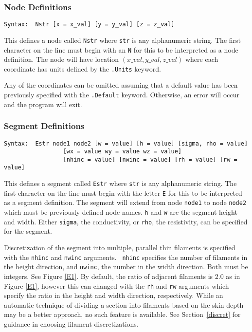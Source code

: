 \subsubsection{Node Definitions}

\begin{verbatim}
Syntax:  Nstr [x = x_val] [y = y_val] [z = z_val]
\end{verbatim}

This defines a node called {\tt Nstr} where {\tt str} is any
alphanumeric string.  The first character on the line must begin with
an {\tt N} for this to be interpreted as a node definition.
The node will have location $ (x\_val, y\_val, z\_val) $ where each
coordinate has units defined by the {\tt .Units} keyword.  

Any of the coordinates can be omitted assuming that a default value
has been previously specified with the {\tt .Default} keyword.
Otherwise, an error will occur and the program will exit.

\subsubsection{Segment Definitions}
\label{segdef}

\begin{verbatim}
Syntax:  Estr node1 node2 [w = value] [h = value] [sigma, rho = value] 
                 [wx = value wy = value wz = value] 
                 [nhinc = value] [nwinc = value] [rh = value] [rw = value]
\end{verbatim}

This defines a segment called {\tt Estr} where {\tt str} is any
alphanumeric string.  The first character on the line must begin with
the letter {\tt E} for this to be interpreted as a segment definition.
The segment will extend from node {\tt node1} to node {\tt node2}
which must be previously defined node names.  {\tt h} and {\tt w} are
the segment height and width.  Either {\tt sigma}, the conductivity,
or {\tt rho}, the resistivity, can be specified for the segment.

Discretization of the segment into multiple, parallel thin filaments
is specified with the {\tt nhinc} and {\tt nwinc} arguments. {\tt
nhinc} specifies the number of filaments in the height direction, and
{\tt nwinc}, the number in the width direction.  Both must be
integers. See Figure \ref{E1}.  By default, the ratio of adjacent
filaments is 2.0 as in Figure \ref{E1}, however this can changed with
the {\tt rh} and {\tt rw} arguments which specify the ratio 
in the height and width direction, respectively.
While an automatic technique of dividing a section into filaments 
based on the skin depth may be a better approach, no such feature is
available.  See Section~\ref{discret} for guidance in choosing
filament discretizations.



